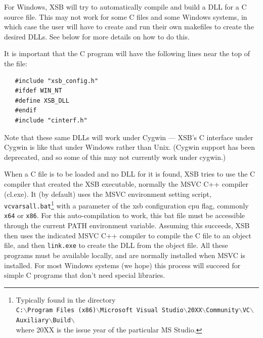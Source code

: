 For Windows, XSB will try to automatically compile and build a DLL for
a C source file.  This may not work for some C files and some Windows
systems, in which case the user will have to create and run their own
makefiles to create the desired DLLs.  See below for more details on
how to do this.

It is important that the C program will have the following lines near the
top of the file:
\begin{verbatim}
   #include "xsb_config.h"  
   #ifdef WIN_NT
   #define XSB_DLL
   #endif
   #include "cinterf.h"
\end{verbatim}

Note that these same DLLs will work under Cygwin --- XSB's C interface
under Cygwin is like that under Windows rather than Unix.  (Cygwin
support has been deprecated, and so some of this may not currently
work under cygwin.)

When a C file is to be loaded and no DLL for it is found, XSB tries to
use the C compiler that created the XSB executable, normally the MSVC
C++ compiler (cl.exe).  It (by default) uses the MSVC environment
setting script, {\tt vcvarsall.bat}\footnote{
  Typically found in the directory
  \\
  \texttt{C:$\backslash$Program Files (x86)$\backslash$Microsoft Visual Studio$\backslash$20XX$\backslash$Community$\backslash$VC$\backslash$Auxiliary$\backslash$Build$\backslash$}
  \\
  where 20XX is the issue year of the particular MS Studio.
  }
with a parameter of the xsb
configuration cpu flag, commonly {\tt x64} or {\tt x86}.  For this
auto-compilation to work, this bat file must be accessible through the
current PATH environment variable.  Assuming this succeeds, XSB then
uses the indicated MSVC C++ compiler to compile the C file to an
object file, and then {\tt link.exe} to create the DLL from the object
file.  All these programs must be available locally, and are normally
installed when MSVC is installed.  For most Windows systems (we hope)
this process will succeed for simple C programs that don't need
special libraries.

